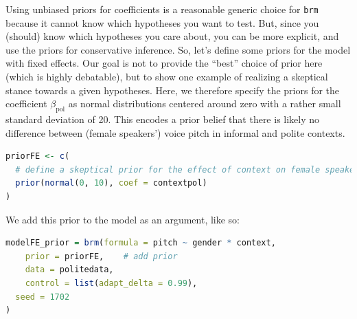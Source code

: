 \documentclass[nobib]{tufte-handout}
\begin{document}
Using unbiased priors for coefficients is a reasonable generic choice for \texttt{brm} because
it cannot know which hypotheses you want to test. But, since you (should) know which hypotheses
you care about, you can be more explicit, and use the priors for conservative inference. So,
let's define some priors for the model with fixed effects. Our goal is not to provide the
``best'' choice of prior here (which is highly debatable), but to show one example of realizing
a skeptical stance towards a given hypotheses. Here, we therefore specify the priors for the
coefficient $\beta_{\text{pol}}$ as normal distributions centered around zero with a rather
small standard deviation of 20. This encodes a prior belief that there is likely no difference
between (female speakers') voice pitch in informal and polite contexts.
%
%
%

\bigskip

\begin{minipage}[]{1\textwidth}
\begin{lstlisting}[language=R]
priorFE <- c(
  # define a skeptical prior for the effect of context on female speakers
  prior(normal(0, 10), coef = contextpol)
)
\end{lstlisting}
\end{minipage}

We add this prior to the model as an argument, like so:

\bigskip

\begin{minipage}[]{1\textwidth}
\begin{lstlisting}[language=R]
modelFE_prior = brm(formula = pitch ~ gender * context,
	prior = priorFE, 	# add prior 
	data = politedata,
	control = list(adapt_delta = 0.99),
  seed = 1702
)    
\end{lstlisting}
\end{minipage}
\end{document}
